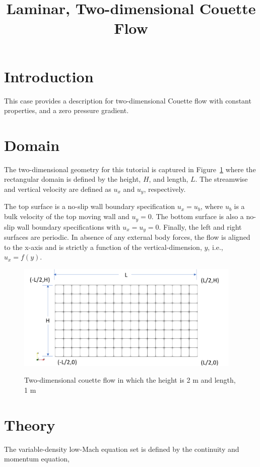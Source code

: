 \documentclass{article}
\title{Laminar, Two-dimensional Couette Flow}
\date{}
\begin{document}
\maketitle

\section{Introduction}
This case provides a description for two-dimensional Couette flow
with constant properties, and a zero pressure gradient.

\section{Domain}
The two-dimensional geometry for this tutorial is captured in 
Figure~\ref{fig:geom} where the rectangular domain is defined by the 
height, $H$, and length, $L$. The streamwise and vertical velocity are 
defined as $u_x$ and $u_y$, respectively.

The top surface is a no-slip wall boundary specification $u_x = u_b$, where $u_b$ is a bulk velocity
of the top moving wall and $u_y = 0$. The bottom surface is also a no-slip wall boundary 
specifications with $u_x = u_y = 0$.
Finally, the left and right surfaces are periodic. In absence of any 
external body forces, the flow is aligned to the x-axis and is 
strictly a function of the vertical-dimension, $y$, i.e., $u_x = f(y)$.

\begin{figure}[!htbp]
  \centering
  {
   \includegraphics[height=2.0in]{images/2d_quad9_couette_geom.pdf}
  }
  \caption{Two-dimensional couette flow in which the height is 2 m and length, 1 m}
  \label{fig:geom}
\end{figure}

\section{Theory}
The variable-density low-Mach equation set is defined by the continuity and momentum equation,
\end{document}

